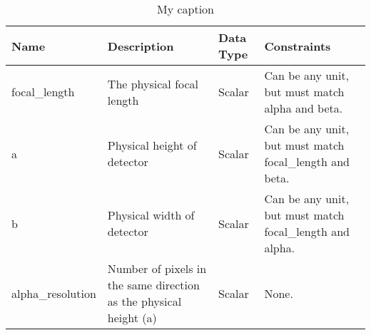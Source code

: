 \documentclass[]{DINOReportMemo}
\begin{document}
\begin{table}[]
\centering
\caption{My caption}
\label{my-label}
\begin{tabular}{|l|l|l|l|}
\hline
Name              & Description                                                                                            & Data Type                                 & Constraints                                                                                                                                                                                                                                                                                                   \\ \hline
focal\_length     & The physical focal length                                                                              & Scalar                                    & Can be any unit, but must match alpha and beta.                                                                                                                                                                                                                                                               \\ \hline
a                 & Physical height of detector                                                                            & Scalar                                    & Can be any unit, but must match focal\_length and beta.                                                                                                                                                                                                                                                       \\ \hline
b                 & Physical width of detector                                                                             & Scalar                                    & Can be any unit, but must match focal\_length and alpha.                                                                                                                                                                                                                                                      \\ \hline
alpha\_resolution & Number of pixels in the same direction as the physical height (a)                                      & Scalar                                    & None.                                                                                                                                                                                                                                                                                                         \\ \hline

\end{tabular}
\end{table}
\end{document}
